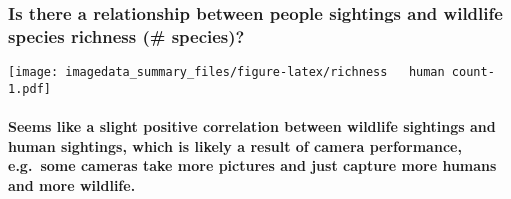 \documentclass[
]{article}
\begin{document}
\subsubsection{Is there a relationship between people sightings and
wildlife species richness (\#
species)?}\label{is-there-a-relationship-between-people-sightings-and-wildlife-species-richness-species}

\texttt{[image: imagedata\_summary\_files/figure-latex/richness ~ human count-1.pdf]}

\paragraph{Seems like a slight positive correlation between wildlife
sightings and human sightings, which is likely a result of camera
performance, e.g.~some cameras take more pictures and just capture more
humans and more
wildlife.}\label{seems-like-a-slight-positive-correlation-between-wildlife-sightings-and-human-sightings-which-is-likely-a-result-of-camera-performance-e.g.-some-cameras-take-more-pictures-and-just-capture-more-humans-and-more-wildlife.}
\end{document}
